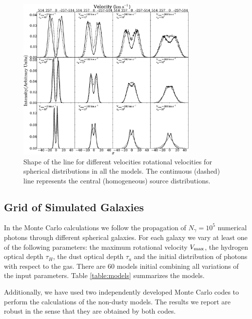 \documentclass{emulateapj}
\newcommand{\ly}{{\ifmmode{{\rm Ly}\alpha~}\else{Ly$\alpha$~}\fi}}
\begin{document}
\begin{figure}
\begin{center}
  \includegraphics[width=0.8\textwidth]{f1.eps}
\end{center}
\caption{Shape of the \ly line for
    different velocities rotational velocities for spherical
    distributions in all the models. The continuous (dashed) line represents the 
    central (homogeneous) source distributions.
    \label{fig:differentvelocities}}  
\end{figure}


\subsection{Grid of Simulated Galaxies}
\label{sec:models}

In the Monte Carlo calculations we follow the propagation of $N_{\gamma}=10^5$
numerical photons through different spherical galaxies. For each galaxy
we vary at least one of the following parameters: the maximum
rotational velocity $V_{\rm max}$, the hydrogen optical depth $\tau_{H}$,
the dust optical depth $\tau_{a}$ and the initial distribution of photons
with respect to the gas. There are $60$ models initial combining all
variations of the input parameters. Table \ref{table:models}
summarizes the models.

Additionally, we have used two independently developed Monte Carlo
codes \citep{CLARA,DijkstraKramer} to perform the calculations of the
non-dusty models. The results we report are robust in the sense
that they are obtained by both codes. 
\end{document}
